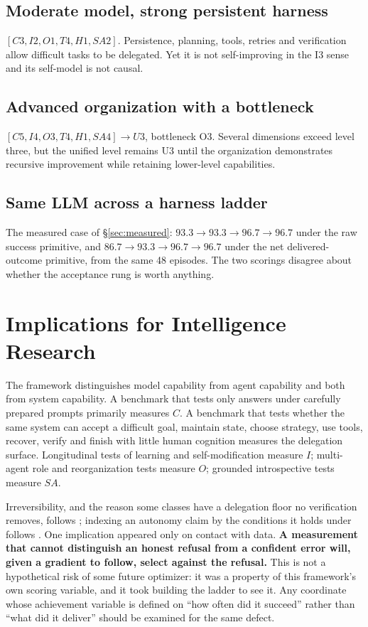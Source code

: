 \subsection{Moderate model, strong persistent harness}
$[C3, I2, O1, T4, H1, SA2]$. Persistence, planning, tools, retries and verification allow difficult tasks to be delegated. Yet it is not self-improving in the I3 sense and its self-model is not causal.

\subsection{Advanced organization with a bottleneck}
$[C5, I4, O3, T4, H1, SA4] \to U3$, bottleneck O3. Several dimensions exceed level three, but the unified level remains U3 until the organization demonstrates recursive improvement while retaining lower-level capabilities.

\subsection{Same LLM across a harness ladder}
The measured case of \S\ref{sec:measured}: $93.3 \to 93.3 \to 96.7 \to 96.7$ under the raw success primitive, and $86.7 \to 93.3 \to 96.7 \to 96.7$ under the net delivered-outcome primitive, from the same 48 episodes. The two scorings disagree about whether the acceptance rung is worth anything.

\section{Implications for Intelligence Research}

The framework distinguishes model capability from agent capability and both from system capability. A benchmark that tests only answers under carefully prepared prompts primarily measures $C$. A benchmark that tests whether the same system can accept a difficult goal, maintain state, choose strategy, use tools, recover, verify and finish with little human cognition measures the delegation surface. Longitudinal tests of learning and self-modification measure $I$; multi-agent role and reorganization tests measure $O$; grounded introspective tests measure $SA$.

Irreversibility, and the reason some classes have a delegation floor no verification removes, follows \citet{perrow1984}; indexing an autonomy claim by the conditions it holds under follows \citet{sae2021j3016}. One implication appeared only on contact with data. \textbf{A measurement that cannot distinguish an honest refusal from a confident error will, given a gradient to follow, select against the refusal.} This is not a hypothetical risk of some future optimizer: it was a property of this framework's own scoring variable, and it took building the ladder to see it. Any coordinate whose achievement variable is defined on ``how often did it succeed'' rather than ``what did it deliver'' should be examined for the same defect.

